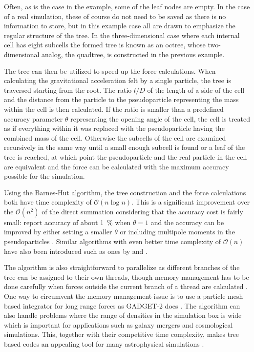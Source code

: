 \documentclass[english, oneside]{HYgradu}
\begin{document}
Often, as is the case in the example, some of the leaf nodes are empty. In the case of a real simulation, these of course do not need to be saved as there is no information to store, but in this example case all are drawn to emphasize the regular structure of the tree. In the three-dimensional case where each internal cell has eight subcells the formed tree is known as an octree, whose two-dimensional analog, the quadtree, is constructed in the previous example.

The tree can then be utilized to speed up the force calculations. When calculating the gravitational acceleration felt by a single particle, the tree is traversed starting from the root. The ratio $l/D$ of the length of a side of the cell and the distance from the particle to the pseudoparticle representing the mass within the cell is then calculated. If the ratio is smaller than a predefined accuracy parameter $\theta$ representing the opening angle of the cell, the cell is treated as if everything within it was replaced with the pseudoparticle having the combined mass of the cell. Otherwise the subcells of the cell are examined recursively in the same way until a small enough subcell is found or a leaf of the tree is reached, at which point the pseudoparticle and the real particle in the cell are equivalent and the force can be calculated with the maximum accuracy possible for the simulation.

Using the Barnes-Hut algorithm, the tree construction and the force calculations both have time complexity of $\mathcal{O}(n \log n)$. This is a significant improvement over the $\mathcal{O}(n^2)$ of the direct summation considering that the accuracy cost is fairly small: \citet{barnes1986hierarchical} report accuracy of about 1~\% when $\theta=1$ and the accuracy can be improved by either setting a smaller $\theta$ or including multipole moments in the pseudoparticles \citep{barnes1989error}. Similar algorithms with even better time complexity of $\mathcal{O}(n)$ have also been introduced such as ones by \citet{dehnen2002hierarchical} and \citet{xue1998n}.

The algorithm is also straightforward to parallelize as different branches of the tree can be assigned to their own threads, though memory management has to be done carefully when forces outside the current branch of a thread are calculated \citep{binney2008galactic}. One way to circumvent the memory management issue is to use a particle mesh based integrator for long range forces as GADGET-2 does \citep{springel2005cosmological}. The algorithm can also handle problems where the range of densities in the simulation box is wide which is important for applications such as galaxy mergers and cosmological simulations. This, together with their competitive time complexity, makes tree based codes an appealing tool for many astrophysical simulations \citep{binney2008galactic}.
\end{document}
